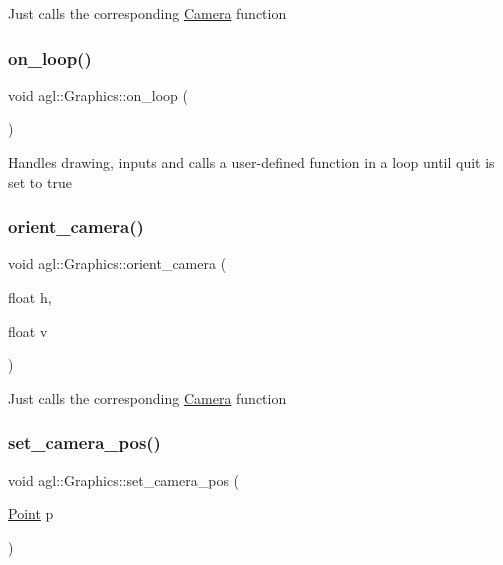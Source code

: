 Just calls the corresponding \mbox{\hyperlink{classagl_1_1Camera}{Camera}} function \mbox{\label{classagl_1_1Graphics_abfecb1bbd932fb29b9d92a08da02684a}} 
\subsubsection{\texorpdfstring{on\_loop()}{on\_loop()}}
{\footnotesize\ttfamily void agl\+::\+Graphics\+::on\+\_\+loop (\begin{DoxyParamCaption}{ }\end{DoxyParamCaption})}

Handles drawing, inputs and calls a user-\/defined function in a loop until quit is set to true \mbox{\label{classagl_1_1Graphics_ae44f29a47ac84c0ab49813dbc0585e46}} 
\subsubsection{\texorpdfstring{orient\_camera()}{orient\_camera()}}
{\footnotesize\ttfamily void agl\+::\+Graphics\+::orient\+\_\+camera (\begin{DoxyParamCaption}\item[{float}]{h,  }\item[{float}]{v }\end{DoxyParamCaption})}

Just calls the corresponding \mbox{\hyperlink{classagl_1_1Camera}{Camera}} function \mbox{\label{classagl_1_1Graphics_ac6b1de3994149a36a53095b9192458a3}} 
\subsubsection{\texorpdfstring{set\_camera\_pos()}{set\_camera\_pos()}}
{\footnotesize\ttfamily void agl\+::\+Graphics\+::set\+\_\+camera\+\_\+pos (\begin{DoxyParamCaption}\item[{\mbox{\hyperlink{classagl_1_1Point}{Point}}}]{p }\end{DoxyParamCaption})}

